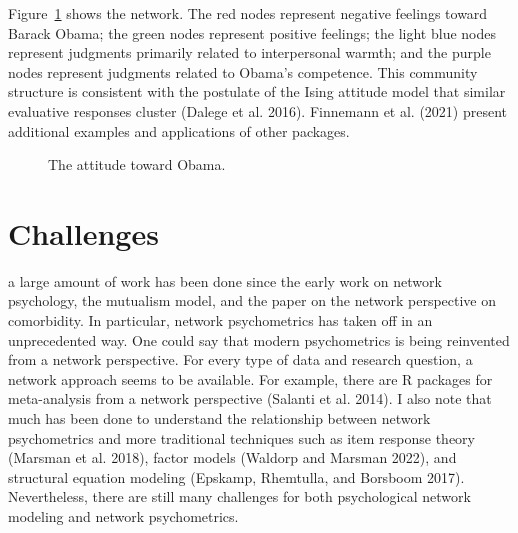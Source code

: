 \documentclass[
  a4paper,
  DIV=11,
  numbers=noendperiod,
  oneside]{scrreprt}
\begin{document}
Figure~\ref{fig-ch6-img19-old-88} shows the network. The red nodes
represent negative feelings toward Barack Obama; the green nodes
represent positive feelings; the light blue nodes represent judgments
primarily related to interpersonal warmth; and the purple nodes
represent judgments related to Obama's competence. This community
structure is consistent with the postulate of the Ising attitude model
that similar evaluative responses cluster (Dalege et al. 2016).
Finnemann et al. (2021) present additional examples and applications of
other packages.

\begin{figure}


\caption{\label{fig-ch6-img19-old-88}The attitude toward Obama.}

\end{figure}%

\section{Challenges}\label{sec-Challenges}

a large amount of work has been done since the early work on network
psychology, the mutualism model, and the paper on the network
perspective on comorbidity. In particular, network psychometrics has
taken off in an unprecedented way. One could say that modern
psychometrics is being reinvented from a network perspective. For every
type of data and research question, a network approach seems to be
available. For example, there are R packages for meta-analysis from a
network perspective (Salanti et al. 2014). I also note that much has
been done to understand the relationship between network psychometrics
and more traditional techniques such as item response theory (Marsman et
al. 2018), factor models (Waldorp and Marsman 2022), and structural
equation modeling (Epskamp, Rhemtulla, and Borsboom 2017). Nevertheless,
there are still many challenges for both psychological network modeling
and network psychometrics.
\end{document}
